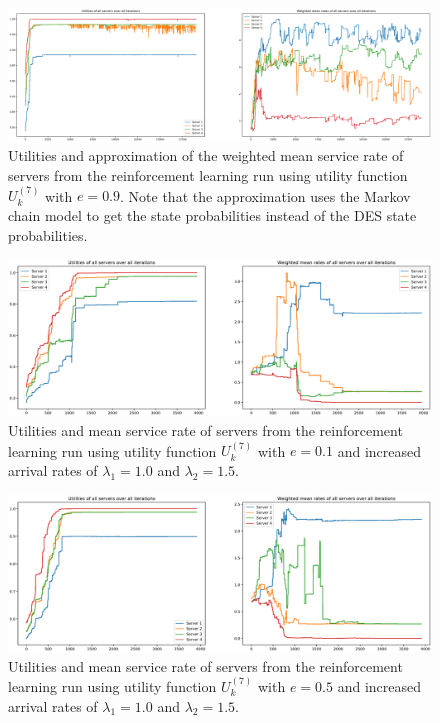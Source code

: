 \begin{figure}[H]
    \includegraphics[width=\textwidth]{chapters/00_appendix/03_more_rl_results/Bin/utility_7_eps/u7_3_e09_markov.eps}
    \caption{Utilities and approximation of the weighted mean service rate of
    servers from the reinforcement learning run using utility function
    \(U_k^{(7)}\) with \(e = 0.9\). Note that the approximation uses the Markov
    chain model to get the state probabilities instead of the DES state
    probabilities.}
    \label{fig:RL_utility7_3_e09_markov}
\end{figure}



\begin{figure}[H]
    \includegraphics[width=\textwidth]{chapters/00_appendix/03_more_rl_results/Bin/utility_7_eps/u7_4_e01_Lambda_25.eps}
    \caption{Utilities and mean service rate of servers from the reinforcement
    learning run using utility function \(U_k^{(7)}\) with \(e = 0.1\) and
    increased arrival rates of \(\lambda_1 = 1.0\) and \(\lambda_2 = 1.5\).}
    \label{fig:RL_utility7_4_e01_Lambda_25}
\end{figure}


\begin{figure}[H]
    \includegraphics[width=\textwidth]{chapters/00_appendix/03_more_rl_results/Bin/utility_7_eps/u7_4_e05_Lambda_25.eps}
    \caption{Utilities and mean service rate of servers from the reinforcement
    learning run using utility function \(U_k^{(7)}\) with \(e = 0.5\) and
    increased arrival rates of \(\lambda_1 = 1.0\) and \(\lambda_2 = 1.5\).}
    \label{fig:RL_utility7_4_e05_Lambda_25}
\end{figure}


